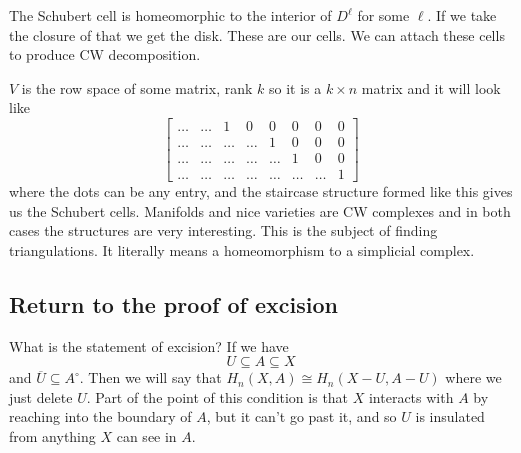 \documentclass[10pt]{article}
\theoremstyle{definition}
\begin{document}
	The Schubert cell is homeomorphic to the interior of $D^\ell$ for some $\ell$. If we take the closure of that we get the disk. These are our cells. We can attach these cells to produce CW decomposition. 
	
	$V$ is the row space of some matrix, rank $k$ so it is a $k\times n$ matrix and it will look like \[
	\begin{bmatrix}
	\dots & \dots & 1 & 0 & 0 & 0 & 0 & 0 \\
	\dots & \dots & \dots & \dots & 1 & 0 & 0 & 0 \\
	\dots & \dots & \dots & \dots & \dots & 1 & 0 & 0\\
	\dots & \dots & \dots & \dots & \dots & \dots & \dots & 1 
	\end{bmatrix}
	\]
	where the dots can be any entry, and the staircase structure formed like this gives us the Schubert cells. Manifolds and nice varieties are CW complexes and in both cases the structures are very interesting. This is the subject of finding triangulations. It literally means a homeomorphism to a simplicial complex. 
	
	\subsection{Return to the proof of excision}
	What is the statement of excision?
	If we have \[
	U\subseteq A \subseteq X
	\] 
	and $\overline{U}\subseteq A^\circ$. Then we will say that $H_n(X,A)\cong H_n(X-U,A-U)$ where we just delete $U$. Part of the point of this condition is that $X$ interacts with $A$ by reaching into the boundary of $A$, but it can't go past it, and so $U$ is insulated from anything $X$ can see in $A$.
	
\end{document}
